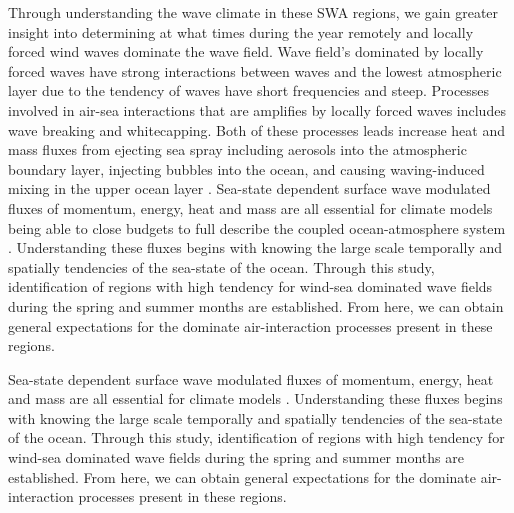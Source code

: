 Through understanding the wave climate in these SWA regions, we gain greater insight into determining at what times during the year remotely and locally forced wind waves dominate the wave field. Wave field's dominated by locally forced waves have strong interactions between waves and the lowest atmospheric layer \cite{cavaleri2012wind} due to the tendency of waves have short frequencies and steep. Processes involved in air-sea interactions that are amplifies by locally forced waves includes wave breaking and whitecapping. Both of these processes leads increase heat and mass fluxes from ejecting sea spray including aerosols into the atmospheric boundary layer, injecting bubbles into the ocean, and causing waving-induced mixing in the upper ocean layer \cite{cavaleri2012wind}. Sea-state dependent surface wave modulated fluxes of momentum, energy, heat and mass are all essential for climate models being able to close budgets to full describe the coupled ocean-atmosphere system \cite{cavaleri2012wind}. Understanding these fluxes begins with knowing the large scale temporally and spatially tendencies of the sea-state of the ocean. Through this study, identification of regions with high tendency for wind-sea dominated wave fields during the spring and summer months are established. From here, we can obtain general expectations for the dominate air-interaction processes present in these regions.

Sea-state dependent surface wave modulated fluxes of momentum, energy, heat and mass are all essential for climate models \cite{cavaleri2012wind}. Understanding these fluxes begins with knowing the large scale temporally and spatially tendencies of the sea-state of the ocean. Through this study, identification of regions with high tendency for wind-sea dominated wave fields during the spring and summer months are established. From here, we can obtain general expectations for the dominate air-interaction processes present in these regions. 